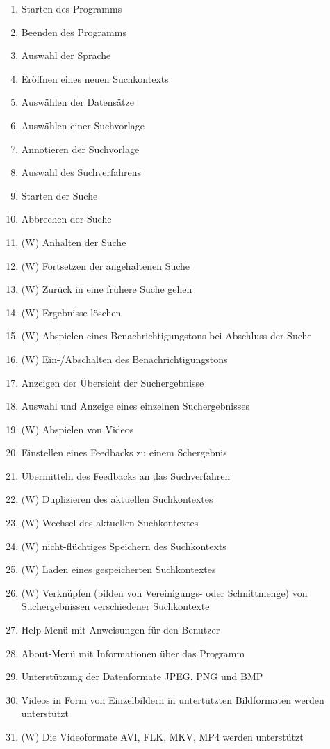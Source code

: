 \begin{enumerate} [label=\bfseries /F \arabic*0/]
	\item Starten des Programms
	\item Beenden des Programms
	\item Auswahl der Sprache
	\item Er\"offnen eines neuen Suchkontexts
	\item Ausw\"ahlen der Datens\"atze
	\item Ausw\"ahlen einer Suchvorlage
	\item Annotieren der Suchvorlage
	\item Auswahl des Suchverfahrens
	\item Starten der Suche
	\item Abbrechen der Suche
	\item (W) Anhalten der Suche
	\item (W) Fortsetzen der angehaltenen Suche
	\item (W) Zurück in eine frühere Suche gehen
	\item (W) Ergebnisse löschen
	\item (W) Abspielen eines Benachrichtigungstons bei Abschluss der Suche
	\item (W) Ein-/Abschalten des Benachrichtigungstons
	\item Anzeigen der \"Ubersicht der Suchergebnisse
	\item Auswahl und Anzeige eines einzelnen Suchergebnisses
	\item (W) Abspielen von Videos
	\item Einstellen eines Feedbacks zu einem Schergebnis
	\item \"Ubermitteln des Feedbacks an das Suchverfahren
	\item (W) Duplizieren des aktuellen Suchkontextes
	\item (W) Wechsel des aktuellen Suchkontextes
	\item (W) nicht-fl\"uchtiges Speichern des Suchkontexts
	\item (W) Laden eines gespeicherten Suchkontextes
	\item (W) Verkn\"upfen (bilden von Vereinigungs- oder Schnittmenge) von Suchergebnissen verschiedener Suchkontexte
	\item Help-Menü mit Anweisungen für den Benutzer
	\item About-Menü mit Informationen über das Programm
	\item Unterstützung der Datenformate JPEG, PNG und BMP
	\item Videos in Form von Einzelbildern in untert\"utzten Bildformaten werden unterst\"utzt
	\item (W) Die Videoformate AVI, FLK, MKV, MP4 werden unterst\"utzt
\end{enumerate}
